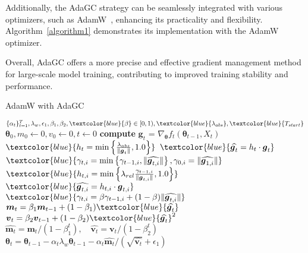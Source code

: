Additionally, the AdaGC strategy can be seamlessly integrated with various optimizers, such as AdamW~\cite{loshchilov2017decoupled}, enhancing its practicality and flexibility. Algorithm~\ref{algorithm1} demonstrates its implementation with the AdamW optimizer.

Overall, AdaGC offers a more precise and effective gradient management method for large-scale model training, contributing to improved training stability and performance.

\begin{algorithm}[!ht]
    \small
    \caption{AdamW with AdaGC}
    \label{algorithm1}
    \setlength{\baselineskip}{1.25em}
\begin{algorithmic}[1]
     $\{\alpha_t\}_{t=1}^{T}, \lambda_{w}, \epsilon_1, \beta_1, \beta_2, \textcolor{blue}{\beta} \in [0, 1), \textcolor{blue}{\lambda_{abs}}, \textcolor{blue}{T_{start}}$
     $\boldsymbol{\theta}_{0}, m_0 \leftarrow 0, v_0 \leftarrow 0, t \leftarrow 0$
    \REPEAT
    \STATE \textbf{compute} $\boldsymbol{g}_{t}$ = $\nabla_{\boldsymbol{\theta}} f_t(\boldsymbol{\theta}_{t-1}, X_t)$
    \STATE $\textcolor{blue}{h_{t} = \min \left\{\frac{\lambda_{abs}}{\|\boldsymbol{g}_{t}\|}, 1.0\right\}}$
    \STATE $\textcolor{blue}{\widehat{\boldsymbol{g}_t} = h_{t} \cdot \boldsymbol{g}_t}$
        \STATE $\textcolor{blue}{\gamma_{t, i} = \min \left\{\gamma_{t-1, i}, \|\widehat{\boldsymbol{g}_{t, i}}\|\right\}, \gamma_{0, i} = \|\widehat{\boldsymbol{g}_{1, i}}\|}$
    \ENDFOR
    \ELSE
        \STATE $\textcolor{blue}{h_{t, i} = \min \left\{\lambda_{rel} \frac{\gamma_{t-1, i}}{\|\boldsymbol{g}_{t, i}\|}, 1.0\right\}}$
        \STATE $\textcolor{blue}{\widehat{\boldsymbol{g}_{t, i}} = h_{t, i} \cdot \boldsymbol{g}_{t, i}}$
        \STATE $\textcolor{blue}{\gamma_{t, i} = \beta \gamma_{t-1, i} + (1 - \beta) \|\widehat{\boldsymbol{g}_{t, i}}\|}$
    \ENDFOR
    \ENDIF
    \STATE $\boldsymbol{m}_{t} = \beta_1 \boldsymbol{m}_{t-1} + (1-\beta_1) \textcolor{blue}{\widehat{\boldsymbol{g}_{t}}}$
    \STATE $\boldsymbol{v}_{t} = \beta_2 \boldsymbol{v}_{t-1} + (1-\beta_2) \textcolor{blue}{\widehat{\boldsymbol{g}_{t}}}^2 $
    \STATE $\widehat{\boldsymbol{m}_{t}} = \boldsymbol{m}_{t}/(1 - \beta_1^t), \quad \widehat{\boldsymbol{v}_{t}} = \boldsymbol{v}_{t}/(1 - \beta_2^t) $
    \STATE $\boldsymbol{\theta}_t = \boldsymbol{\theta}_{t-1} - \alpha_t \lambda_{w} \boldsymbol{\theta}_{t-1} - \alpha_t \widehat{\boldsymbol{m}_{t}}/(\sqrt{\widehat{\boldsymbol{v}_{t}}} + \epsilon_1)$
    \vskip -0.2in
\end{algorithmic}
\end{algorithm}


